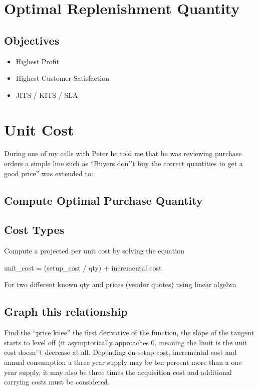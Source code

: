 \documentclass[letterpaper,10pt,english]{sphinxmanual}
\begin{document}
\section{Optimal Replenishment Quantity}
\label{\detokenize{200-OptimalReplenishmentQuantity:optimal-replenishment-quantity}}\label{\detokenize{200-OptimalReplenishmentQuantity::doc}}

\subsection{Objectives}
\label{\detokenize{200-OptimalReplenishmentQuantity:objectives}}\begin{itemize}
\item {} 
Highest Profit

\item {} 
Highest Customer Satisfaction

\item {} 
JITS / KITS / SLA

\end{itemize}


\section{Unit Cost}
\label{\detokenize{300-UnitCost:unit-cost}}\label{\detokenize{300-UnitCost::doc}}
During one of my calls with Peter he told me that he was reviewing
purchase orders a simple line such as “Buyers don’’t buy the correct
quantities to get a good price” was extended to:


\subsection{Compute Optimal Purchase Quantity}
\label{\detokenize{300-UnitCost:compute-optimal-purchase-quantity}}

\subsection{Cost Types}
\label{\detokenize{300-UnitCost:cost-types}}
Compute a projected per unit cost by solving the equation

unit\_cost = (setup\_cost / qty) + incremental cost

For two different known qty and prices (vendor quotes) using linear
algebra


\subsection{Graph this relationship}
\label{\detokenize{300-UnitCost:graph-this-relationship}}
Find the “price knee” the first derivative of the function, the slope of
the tangent starts to level off (it asymptotically approaches 0, meaning
the limit is the unit cost doesn’’t decrease at all. Depending on setup
cost, incremental cost and annual consumption a three year supply may be
ten percent more than a one year supply, it may also be three times the
acquisition cost and additional carrying costs must be considered.
\end{document}
